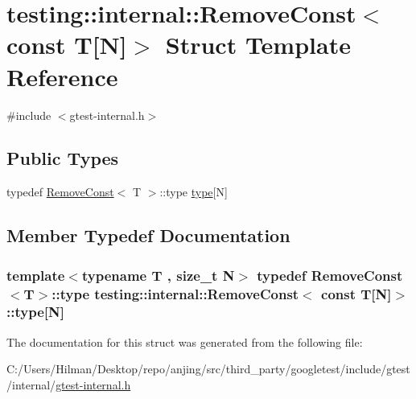 \hypertarget{structtesting_1_1internal_1_1_remove_const_3_01const_01_t[_n]_4}{}\section{testing\+:\+:internal\+:\+:Remove\+Const$<$ const T\mbox{[}N\mbox{]}$>$ Struct Template Reference}
\label{structtesting_1_1internal_1_1_remove_const_3_01const_01_t[_n]_4}


{\ttfamily \#include $<$gtest-\/internal.\+h$>$}

\subsection*{Public Types}
\begin{DoxyCompactItemize}
\item 
typedef \hyperlink{structtesting_1_1internal_1_1_remove_const}{Remove\+Const}$<$ T $>$\+::type \hyperlink{structtesting_1_1internal_1_1_remove_const_3_01const_01_t[_n]_4_ac976b53cb5d031a120fafbe790650068}{type}\mbox{[}N\mbox{]}
\end{DoxyCompactItemize}


\subsection{Member Typedef Documentation}
\hypertarget{structtesting_1_1internal_1_1_remove_const_3_01const_01_t[_n]_4_ac976b53cb5d031a120fafbe790650068}{}
\subsubsection[{type}]{\setlength{\rightskip}{0pt plus 5cm}template$<$typename T , size\+\_\+t N$>$ typedef {\bf Remove\+Const}$<$T$>$\+::type {\bf testing\+::internal\+::\+Remove\+Const}$<$ const T\mbox{[}N\mbox{]}$>$\+::type\mbox{[}N\mbox{]}}\label{structtesting_1_1internal_1_1_remove_const_3_01const_01_t[_n]_4_ac976b53cb5d031a120fafbe790650068}


The documentation for this struct was generated from the following file\+:\begin{DoxyCompactItemize}
\item 
C\+:/\+Users/\+Hilman/\+Desktop/repo/anjing/src/third\+\_\+party/googletest/include/gtest/internal/\hyperlink{gtest-internal_8h}{gtest-\/internal.\+h}\end{DoxyCompactItemize}
